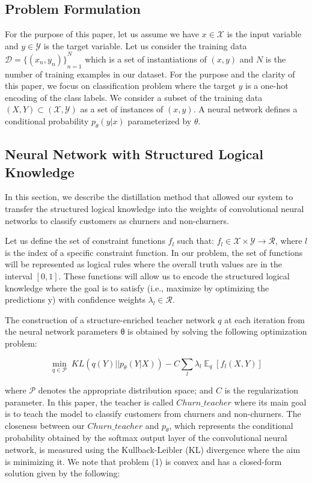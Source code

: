 \documentclass[11pt,letterpaper]{article}
\DeclareMathOperator{\E}{\mathbb{E}}
\begin{document}
\subsection{Problem Formulation }

For the purpose of this paper, let us assume we have \(x \in \mathcal{X}\) is the input variable and \(y \in \mathcal{Y}\) is the target variable. Let us consider the training data \(\mathcal{D}={\{(x_n,y_n)\}}_{n=1}^N\) which is a set of instantiations of \((x, y)\) and \(N\) is the number of training examples in our dataset. For the purpose and the clarity of this paper, we focus on classification problem where the target \(y\) is a one-hot encoding of the class labels. We consider a subset of the training data \((X, Y) \subset (\mathcal{X} , \mathcal{Y})\) as a set of instances of \((x, y)\). A neural network defines a conditional probability \(p_\theta (y|x)\) parameterized by \(\theta\). 

\subsection{Neural Network with Structured Logical Knowledge }

In this section, we describe the distillation method that allowed our system to transfer the structured logical knowledge into the weights of convolutional neural networks to classify customers as churners and non-churners. 

Let us define the set of constraint functions \(f_l\) such that: \(f_l \in \mathcal{X} \times \mathcal{Y} \rightarrow \mathcal{R}\), where \(l\) is the index of a specific constraint function. In our problem, the set of functions will be represented as logical rules where the overall truth values are in the interval \([0, 1]\). These functions will allow us to encode the structured logical knowledge where the goal is to satisfy (i.e., maximize by optimizing the predictions y) with confidence weights \(\lambda_l \in \mathcal{R}\). 

The construction of a structure-enriched teacher network \(q\) at each iteration from the neural network parameters θ is obtained by solving the following optimization problem:

\begin{equation} \label{equation1}  \underset{q \in \mathcal{P}}{\min}\; KL(q(Y) || p_\theta (Y|X)) - C \sum_l \lambda_l \E_q [f_l (X,Y)] \end{equation}

where \(\mathcal{P}\) denotes the appropriate distribution space; and \(C\) is the regularization parameter. In this paper, the teacher is called \(Churn\_teacher\) where its main goal is to teach the model to classify customers from churners and non-churners. The closeness between our \(Churn\_teacher\) and \(p_\theta\), which represents the conditional probability obtained by the softmax output layer of the convolutional neural network, is measured using the Kullback-Leibler (KL) divergence where the aim is minimizing it. We note that problem (1) is convex and has a closed-form solution given by the following:
\end{document}
